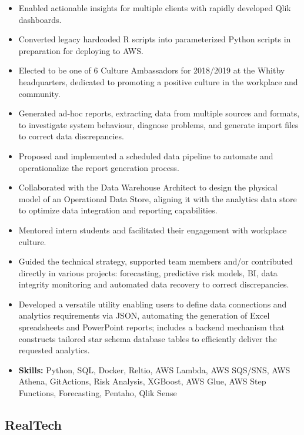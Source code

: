 \documentclass[11pt, a4paper, sans]{moderncv}
\begin{document}
{\begin{itemize}
        \item Enabled actionable insights for multiple clients with rapidly developed Qlik dashboards.
        \item Converted legacy hardcoded R scripts into parameterized Python scripts in preparation for deploying to AWS.
        \item Elected to be one of 6 Culture Ambassadors for 2018/2019 at the Whitby headquarters, dedicated to promoting a positive culture in the workplace and community.
        \item Generated ad-hoc reports, extracting data from multiple sources and formats, to investigate system behaviour, diagnose problems, and generate import files to correct data discrepancies.
        \item Proposed and implemented a scheduled data pipeline to automate and operationalize the report generation process.
        \item Collaborated with the Data Warehouse Architect to design the physical model of an Operational Data Store, aligning it with the analytics data store to optimize data integration and reporting capabilities.
        \item Mentored intern students and facilitated their engagement with workplace culture.
        \item Guided the technical strategy, supported team members and/or contributed directly in various projects: forecasting, predictive risk models, BI, data integrity monitoring and automated data recovery to correct discrepancies.
        \item Developed a versatile utility enabling users to define data connections and analytics requirements via JSON, automating the generation of Excel spreadsheets and PowerPoint reports; includes a backend mechanism that constructs tailored star schema database tables to efficiently deliver the requested analytics.
        \item \textbf{Skills:} Python, SQL, Docker, Reltio, AWS Lambda, AWS SQS/SNS, AWS Athena, GitActions, Risk Analysis, XGBoost, AWS Glue, AWS Step Functions, Forecasting, Pentaho, Qlik Sense
    \end{itemize}
}

\subsection{RealTech}
\end{document}
